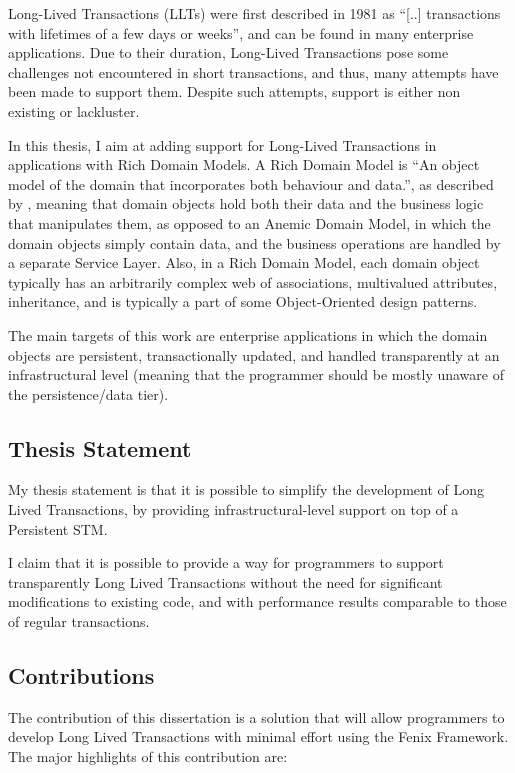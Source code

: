 \documentclass{llncs}
\begin{document}
Long-Lived Transactions (LLTs) were first described in 1981 as ``[..]
transactions with lifetimes of a few days or
weeks''\cite{gray1981transaction}, and can be found in many enterprise
applications. Due to their duration, Long-Lived Transactions pose some
challenges not encountered in short transactions, and thus, many
attempts have been made to support them. Despite such attempts,
support is either non existing or lackluster.

In this thesis, I aim at adding support for Long-Lived Transactions in
applications with Rich Domain Models.  A Rich Domain Model is ``An
object model of the domain that incorporates both behaviour and
data.'', as described by \cite{fowler2003patterns}, meaning that
domain objects hold both their data and the business logic that
manipulates them, as opposed to an Anemic Domain Model, in which the
domain objects simply contain data, and the business operations are
handled by a separate Service Layer. Also, in a Rich Domain Model,
each domain object typically has an arbitrarily complex web of
associations, multivalued attributes, inheritance, and is typically a
part of some Object-Oriented design patterns.

The main targets of this work are enterprise applications in which the
domain objects are persistent, transactionally updated, and handled
transparently at an infrastructural level (meaning that the programmer
should be mostly unaware of the persistence/data tier).

\subsection{Thesis Statement}

My thesis statement is that it is possible to simplify the development
of Long Lived Transactions, by providing infrastructural-level support
on top of a Persistent STM.

I claim that it is possible to provide a way for programmers to
support transparently Long Lived Transactions without the need for
significant modifications to existing code, and with performance
results comparable to those of regular transactions.

\subsection{Contributions}

The contribution of this dissertation is a solution that will allow
programmers to develop Long Lived Transactions with minimal effort
using the Fenix Framework. The major highlights of this contribution
are:
\end{document}
